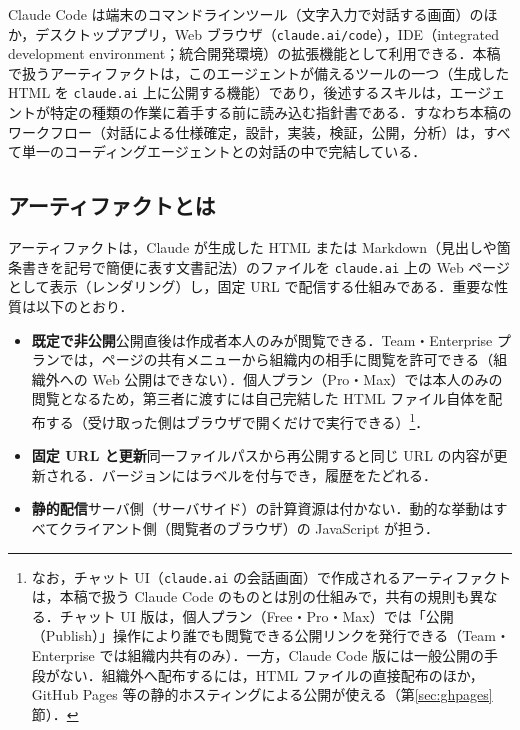 \documentclass[a4paper]{jlreq}
\begin{document}
Claude Code は端末のコマンドラインツール（文字入力で対話する画面）のほか，デスクトップアプリ，Web ブラウザ（\texttt{claude.ai/code}），IDE（integrated development environment；統合開発環境）の拡張機能として利用できる．本稿で扱うアーティファクトは，このエージェントが備えるツールの一つ（生成した HTML を \texttt{claude.ai} 上に公開する機能）であり，後述するスキルは，エージェントが特定の種類の作業に着手する前に読み込む指針書である．すなわち本稿のワークフロー（対話による仕様確定，設計，実装，検証，公開，分析）は，すべて単一のコーディングエージェントとの対話の中で完結している．

\subsection{アーティファクトとは}

アーティファクトは，Claude が生成した HTML または Markdown（見出しや箇条書きを記号で簡便に表す文書記法）のファイルを \texttt{claude.ai} 上の Web ページとして表示（レンダリング）し，固定 URL で配信する仕組みである\cite{anthropic-artifacts}．重要な性質は以下のとおり．

\begin{itemize}
  \item \textbf{既定で非公開}\quad 公開直後は作成者本人のみが閲覧できる．Team・Enterprise プランでは，ページの共有メニューから組織内の相手に閲覧を許可できる（組織外への Web 公開はできない）．個人プラン（Pro・Max）では本人のみの閲覧となるため，第三者に渡すには自己完結した HTML ファイル自体を配布する（受け取った側はブラウザで開くだけで実行できる）\footnote{なお，チャット UI（\texttt{claude.ai} の会話画面）で作成されるアーティファクトは，本稿で扱う Claude Code のものとは別の仕組みで，共有の規則も異なる．チャット UI 版は，個人プラン（Free・Pro・Max）では「公開（Publish）」操作により誰でも閲覧できる公開リンクを発行できる（Team・Enterprise では組織内共有のみ）\cite{anthropic-publish}．一方，Claude Code 版には一般公開の手段がない．組織外へ配布するには，HTML ファイルの直接配布のほか，GitHub Pages 等の静的ホスティングによる公開が使える（第\ref{sec:ghpages}節）．}．
  \item \textbf{固定 URL と更新}\quad 同一ファイルパスから再公開すると同じ URL の内容が更新される．バージョンにはラベルを付与でき，履歴をたどれる．
  \item \textbf{静的配信}\quad サーバ側（サーバサイド）の計算資源は付かない．動的な挙動はすべてクライアント側（閲覧者のブラウザ）の JavaScript が担う．
\end{itemize}
\end{document}
